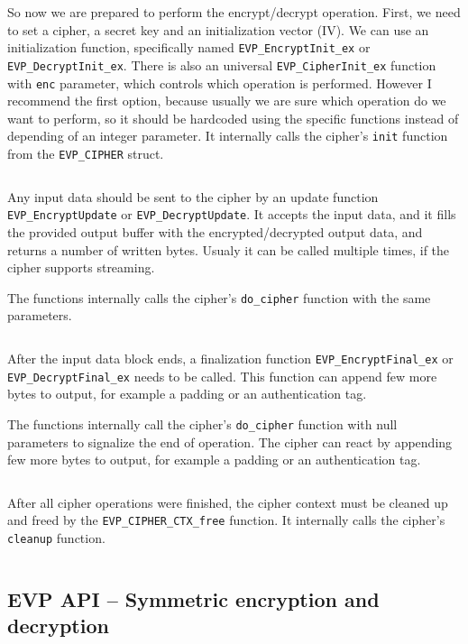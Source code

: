 So now we are prepared to perform the encrypt/decrypt operation. First, we need to set a cipher, a secret key and an initialization vector (IV). We can use an initialization function, specifically named \texttt{EVP\_EncryptInit\_ex} or \texttt{EVP\_DecryptInit\_ex}. There is also an universal \texttt{EVP\_CipherInit\_ex} function with \texttt{enc} parameter, which controls which operation is performed. However I recommend the first option, because usually we are sure which operation do we want to perform, so it should be hardcoded using the specific functions instead of depending of an integer parameter. It internally calls the cipher's \texttt{init} function from the \texttt{EVP\_CIPHER} struct.

\inputminted{c}{code/openssl-evp-cipherinit.c}

Any input data should be sent to the cipher by an update function \texttt{EVP\_EncryptUpdate} or \texttt{EVP\_DecryptUpdate}. It accepts the input data, and it fills the provided output buffer with the encrypted/decrypted output data, and returns a number of written bytes. Usualy it can be called multiple times, if the cipher supports streaming.

The functions internally calls the cipher's \texttt{do\_cipher} function with the same parameters.

\inputminted{c}{code/openssl-evp-cipherupdate.c}

After the input data block ends, a finalization function \texttt{EVP\_EncryptFinal\_ex} or \texttt{EVP\_DecryptFinal\_ex} needs to be called. This function can append few more bytes to output, for example a padding or an authentication tag.

The functions internally call the cipher's \texttt{do\_cipher} function with null parameters to signalize the end of operation. The cipher can react by appending few more bytes to output, for example a padding or an authentication tag.

\inputminted{c}{code/openssl-evp-cipherfinal.c}

After all cipher operations were finished, the cipher context must be cleaned up and freed by the \texttt{EVP\_CIPHER\_CTX\_free} function. It internally calls the cipher's \texttt{cleanup} function.

\inputminted{c}{code/openssl-evp-cipher-ctx-free.c}


\subsection{EVP API -- Symmetric encryption and decryption}
\label{toc/openssl-evp-encryption}

